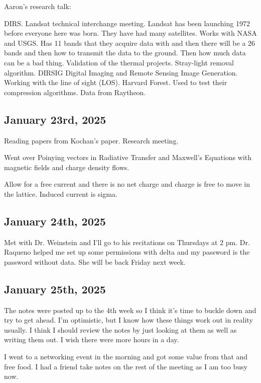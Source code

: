 \documentclass{article}
\begin{document}
Aaron's research talk: 

DIRS. Landsat technical interchange meeting. Landsat has been launching 1972 before everyone here was born. They have had many satellites. Works with NASA and USGS. Has 11 bands that they acquire data with and then there will be a 26 bands and then how to transmit the data to the ground. Then how much data can be a bad thing. Validation of the thermal projects. Stray-light removal algorithm. DIRSIG Digital Imaging and Remote Sensing Image Generation. Working with the line of sight (LOS). Harvard Forest. Used to test their compression algorithms. Data from Raytheon. 


\subsection{January 23rd, 2025}
Reading papers from Kochan's paper. 
Research meeting. 

Went over Poinying vectors in Radiative Transfer and Maxwell's Equations with magnetic fields and charge density flows. 

Allow for a free current and there is no net charge and charge is free to move in the lattice. Induced current is sigma. 


\subsection{January 24th, 2025}

Met with Dr. Weinstein and I'll go to his recitations on Thursdays at 2 pm. Dr. Raqueno helped me set up some permissions with delta and my password is the password without data. She will be back Friday next week. 


\subsection{January 25th, 2025}
The notes were posted up to the 4th week so I think it's time to buckle down and try to get ahead. I'm optimistic, but I know how these things work out in reality usually. I think I should review the notes by just looking at them as well as writing them out. I wish there were more hours in a day. 

I went to a networking event in the morning and got some value from that and free food. I had a friend take notes on the rest of the meeting as I am too busy now. 
\end{document}
